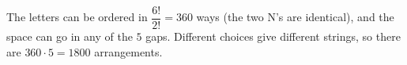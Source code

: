 The letters can be ordered in $\dfrac{6!}{2!}=360$ ways (the two N's are identical), and the space can go in any of the $5$ gaps. Different choices give different strings, so there are $360\cdot5=\boxed{1800}$ arrangements.
